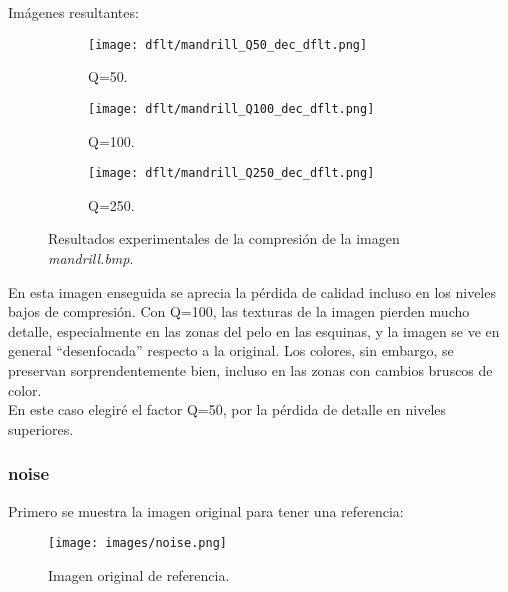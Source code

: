 \documentclass[12pt,a4paper]{article}
\begin{document}
Imágenes resultantes:
\begin{figure}   [H]
    \begin{subfigure}{0.30\textwidth}
        \centering
        \texttt{[image: dflt/mandrill\_Q50\_dec\_dflt.png]}
        \caption{Q=50.}
        
    \end{subfigure}
    \hfill
    \begin{subfigure}{0.30\textwidth}
        \centering
        \texttt{[image: dflt/mandrill\_Q100\_dec\_dflt.png]}
        \caption{Q=100.}
        
    \end{subfigure}
    \hfill
    \begin{subfigure}{0.30\textwidth}
        \centering
        \texttt{[image: dflt/mandrill\_Q250\_dec\_dflt.png]}
        \caption{Q=250.}
        
    \end{subfigure}
    
    \caption[Resultados experimentales - mandrill]{Resultados experimentales de la compresión de la imagen \textit{mandrill.bmp}.}
    
\end{figure}

En esta imagen enseguida se aprecia la pérdida de calidad incluso en los niveles bajos de compresión. Con Q=100, las texturas de la imagen pierden mucho detalle, especialmente en las zonas del pelo en las esquinas, y la imagen se ve en general ``desenfocada'' respecto a la original. Los colores, sin embargo, se preservan sorprendentemente bien, incluso en las zonas con cambios bruscos de color.\\

En este caso elegiré el factor Q=50, por la pérdida de detalle en niveles superiores.\\


\subsubsection{noise}
Primero se muestra la imagen original para tener una referencia:
\begin{figure}[H]
    \centering
    \texttt{[image: images/noise.png]}
    \caption[Referencia - noise]{Imagen original de referencia.}
    
\end{figure}
    
    \vspace{0.5cm}
\end{document}
